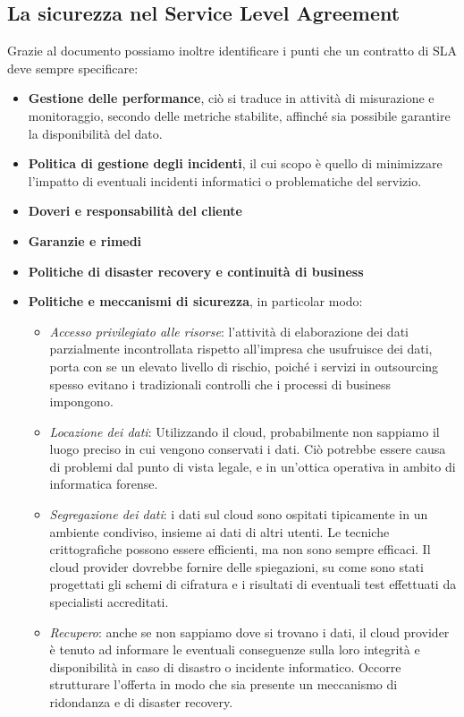 \subsection {La sicurezza nel Service Level Agreement}
Grazie al documento \cite{CloudSecurityIssues} possiamo inoltre identificare i punti che un contratto di SLA deve sempre specificare:
\begin{itemize}
\item \textbf{Gestione delle performance}, ciò si traduce in attività di misurazione e monitoraggio, secondo delle metriche stabilite, affinché sia possibile garantire la disponibilità del dato.
\item \textbf{Politica di gestione degli incidenti}, il cui scopo è quello di minimizzare l'impatto di eventuali incidenti informatici o problematiche del servizio.
\item \textbf{Doveri e responsabilità del cliente}
\item \textbf{Garanzie e rimedi}
\item \textbf{Politiche di disaster recovery e continuità di business}
\item \textbf{Politiche e meccanismi di sicurezza}, in particolar modo:
\begin{itemize}
\item \textit{Accesso privilegiato alle risorse}: l'attività di elaborazione dei dati parzialmente incontrollata rispetto all'impresa che usufruisce dei dati, porta con se un elevato livello di rischio, poiché i servizi in outsourcing spesso evitano i tradizionali controlli che i processi di business impongono.
\item \textit{Locazione dei dati}: Utilizzando il cloud, probabilmente non sappiamo il luogo preciso in cui vengono conservati i dati. Ciò potrebbe essere causa di problemi dal punto di vista legale, e in un'ottica operativa in ambito di informatica forense.
\item \textit{Segregazione dei dati}: i dati sul cloud sono ospitati tipicamente in un ambiente condiviso, insieme ai dati di altri utenti. Le tecniche crittografiche possono essere efficienti, ma non sono sempre efficaci. Il cloud provider dovrebbe fornire delle spiegazioni, su come sono stati progettati gli schemi di cifratura e i risultati di eventuali test effettuati da specialisti accreditati.
\item \textit{Recupero}: anche se non sappiamo dove si trovano i dati, il cloud provider è tenuto ad informare le eventuali conseguenze sulla loro integrità e disponibilità in caso di disastro o incidente informatico. Occorre strutturare l'offerta in modo che sia presente un meccanismo di ridondanza e di disaster recovery.

\end{itemize}
\end{itemize}
